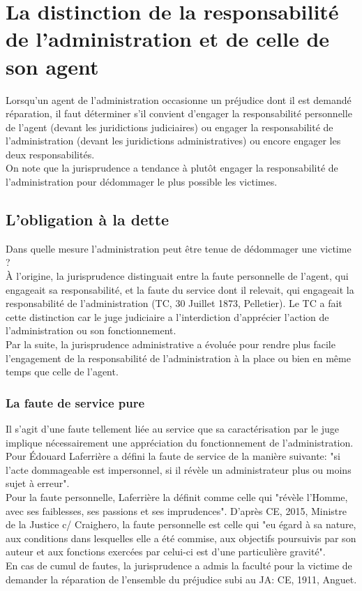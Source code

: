 \documentclass[10pt, a4paper, openany]{book}
\begin{document}
\section{La distinction de la responsabilité de l'administration et de celle de son agent}

Lorsqu'un agent de l'administration occasionne un préjudice dont il est demandé réparation, il faut déterminer s'il convient d'engager la responsabilité personnelle de l'agent (devant les juridictions judiciaires) ou engager la responsabilité de l'administration (devant les juridictions administratives) ou encore engager les deux responsabilités. \\
On note que la jurisprudence a tendance à plutôt engager la responsabilité de l'administration pour dédommager le plus possible les victimes. 

\subsection{L'obligation à la dette}

Dans quelle mesure l'administration peut être tenue de dédommager une victime ? \\
À l'origine, la jurisprudence distinguait entre la faute personnelle de l'agent, qui engageait sa responsabilité, et la faute du service dont il relevait, qui engageait la responsabilité de l'administration (TC, 30 Juillet 1873, Pelletier). Le TC a fait cette distinction car le juge judiciaire a l'interdiction d'apprécier l'action de l'administration ou son fonctionnement. \\
Par la suite, la jurisprudence administrative a évoluée pour rendre plus facile l'engagement de la responsabilité de l'administration à la place ou bien en même temps que celle de l'agent. 

\subsubsection{La faute de service pure}

Il s'agit d'une faute tellement liée au service que sa caractérisation par le juge implique nécessairement une appréciation du fonctionnement de l'administration. \\
Pour Édouard Laferrière a défini la faute de service de la manière suivante: "si l'acte dommageable est impersonnel, si il révèle un administrateur plus ou moins sujet à erreur". \\
Pour la faute personnelle, Laferrière la définit comme celle qui "révèle l'Homme, avec ses faiblesses, ses passions et ses imprudences". D'après CE, 2015, Ministre de la Justice c/ Craighero, la faute personnelle est celle qui "eu égard à sa nature, aux conditions dans lesquelles elle a été commise, aux objectifs poursuivis par son auteur et aux fonctions exercées par celui-ci est d'une particulière gravité". \\
En cas de cumul de fautes, la jurisprudence a admis la faculté pour la victime de demander la réparation de l'ensemble du préjudice subi au JA: CE, 1911, Anguet.
\end{document}
